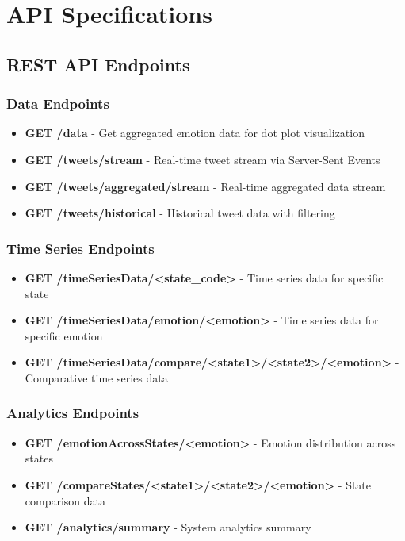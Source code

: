 \section{API Specifications}

\subsection{REST API Endpoints}

\subsubsection{Data Endpoints}
\begin{itemize}
\item \textbf{GET /data} - Get aggregated emotion data for dot plot visualization
\item \textbf{GET /tweets/stream} - Real-time tweet stream via Server-Sent Events
\item \textbf{GET /tweets/aggregated/stream} - Real-time aggregated data stream
\item \textbf{GET /tweets/historical} - Historical tweet data with filtering
\end{itemize}

\subsubsection{Time Series Endpoints}
\begin{itemize}
\item \textbf{GET /timeSeriesData/<state\_code>} - Time series data for specific state
\item \textbf{GET /timeSeriesData/emotion/<emotion>} - Time series data for specific emotion
\item \textbf{GET /timeSeriesData/compare/<state1>/<state2>/<emotion>} - Comparative time series data
\end{itemize}

\subsubsection{Analytics Endpoints}
\begin{itemize}
\item \textbf{GET /emotionAcrossStates/<emotion>} - Emotion distribution across states
\item \textbf{GET /compareStates/<state1>/<state2>/<emotion>} - State comparison data
\item \textbf{GET /analytics/summary} - System analytics summary
\end{itemize}

